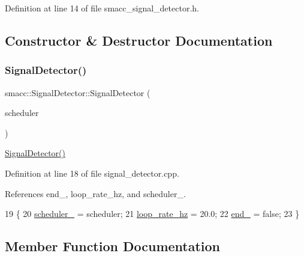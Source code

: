 Definition at line 14 of file smacc\+\_\+signal\+\_\+detector.\+h.



\subsection{Constructor \& Destructor Documentation}
\mbox{\label{classsmacc_1_1SignalDetector_a24914014feb0ab01e2452af705ef2774}} 
\subsubsection{\texorpdfstring{Signal\+Detector()}{SignalDetector()}}
{\footnotesize\ttfamily smacc\+::\+Signal\+Detector\+::\+Signal\+Detector (\begin{DoxyParamCaption}\item[{\hyperlink{smacc__fifo__scheduler_8h_a0063e275231c80d5f97df21d17257bf7}{Smacc\+Fifo\+Scheduler} $\ast$}]{scheduler }\end{DoxyParamCaption})}

\hyperlink{classsmacc_1_1SignalDetector_a24914014feb0ab01e2452af705ef2774}{Signal\+Detector()} 

Definition at line 18 of file signal\+\_\+detector.\+cpp.



References end\+\_\+, loop\+\_\+rate\+\_\+hz, and scheduler\+\_\+.


\begin{DoxyCode}
19     \{
20         \hyperlink{classsmacc_1_1SignalDetector_adaee5b9b91d0e6305dc1ab30f7ab566d}{scheduler\_} = scheduler;
21         \hyperlink{classsmacc_1_1SignalDetector_a41a2ae4262ed350f46d8b886bdc1dfa5}{loop\_rate\_hz} = 20.0;
22         \hyperlink{classsmacc_1_1SignalDetector_aaee266393c01693528a2d74b1f2354a2}{end\_} = \textcolor{keyword}{false};
23     \}
\end{DoxyCode}


\subsection{Member Function Documentation}
\mbox{\label{classsmacc_1_1SignalDetector_a47ec2df560e2e33758ce3975bece9385}} 
